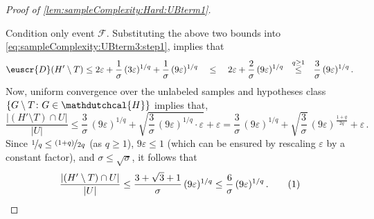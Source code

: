 \documentclass[11pt]{article}
\theoremstyle{plain}
\theoremstyle{definition}
\theoremstyle{remark}
\newcommand{\yesnum}{\addtocounter{equation}{1}\tag{\theequation}}
\newcommand{\Stackrel}[2]{\stackrel{\mathmakebox[\widthof{\ensuremath{#2}}]{#1}}{#2}}
\def\abs#1{\left| #1 \right|}
\newcommand{\inbrace}[1]{\left\{#1\right\}}
\newcommand{\evF}{\ensuremath{\mathscr{F}}}
\newcommand{\nfrac}[2]{\nicefrac{#1}{#2}}
\newcommand{\eps}{\varepsilon}
\newcommand{\customcal}[1]{\euscr{#1}}
\newcommand{\cD}{\customcal{D}}
\newcommand{\hypo}[1]{\mathdutchcal{#1}}
\newcommand{\hyH}{\hypo{H}}
\begin{document}
\begin{proof}[Proof of \cref{lem:sampleComplexity:Hard:UBterm1}]
\begin{enumerate}
                    \end{enumerate}
                    Condition only event $\evF$.
                    Substituting the above two bounds into \cref{eq:sampleComplexity:UBterm3:step1}, implies that 
                    \[
                        \cD(H'\setminus T) \leq 2\eps + \frac{1}{\sigma}\,(3\eps)^{1/q} + \frac{1}{\sigma}\,(9\eps )^{1/q}
                        ~~~\Stackrel{}{\leq}~~~ 2\eps + \frac{2}{\sigma}\,(9\eps )^{1/q}
                        ~~~\Stackrel{q\geq 1}{\leq}~~~
                        \frac{3}{\sigma}\,(9\eps )^{1/q}\,.
                    \]
                    Now, uniform convergence over the unlabeled samples and hypotheses class $\inbrace{G\setminus T\colon G\in \hyH}$ implies that,
                    \[
                        \frac{\abs{(H'\setminus T)\cap U}}{\abs{U}}
                        \leq 
                        \frac{3}{\sigma}\,(9\eps )^{1/q}
                        + 
                        \sqrt{\frac{3}{\sigma}\,(9\eps )^{1/q}\cdot \eps}
                        +
                        \eps 
                        =
                        \frac{3}{\sigma}\, (9\eps )^{1/q}
                        + 
                        \sqrt{\frac{3}{\sigma}}\,(9\eps )^{\frac{1+q}{2q}}
                        +\eps\,.
                    \]
                    Since $\nfrac{1}{q}\leq \nfrac{(1+q)}{2q}$ (as $q\geq 1$), $9\eps \leq 1$ (which can be ensured by rescaling $\eps$ by a constant factor), and $\sigma\leq \sqrt{\sigma}$, it follows that 
                    \[
                        \frac{\abs{(H'\setminus T)\cap U}}{\abs{U}}
                        \leq 
                        \frac{3+\sqrt{3}+1}{\sigma}\, (9\eps )^{1/q}
                        \leq  \frac{6}{\sigma}\, (9\eps )^{1/q}\,.
                        \yesnum\label{eq:sampleComplexity:boundSamples}
                    \]

\end{proof}
\end{document}
